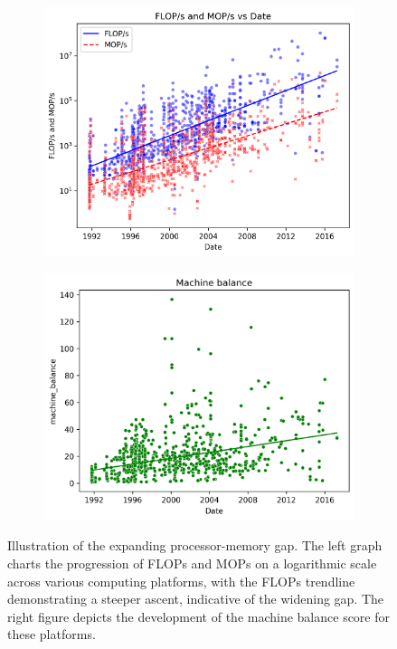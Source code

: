 \begin{figure}
	\begin{subfigure}{.5\textwidth}
		\centering
		\includegraphics[width=\linewidth]{pictures/FLOPs_MOPs_vs_Date.png}
	\end{subfigure}
	\begin{subfigure}{.5\textwidth}
		\centering
		\includegraphics[width=\linewidth]{pictures/machine_balance.png}
	\end{subfigure}
	\caption{Illustration of the expanding processor-memory gap. The left graph charts the progression of FLOPs and MOPs on a logarithmic scale across various computing platforms, with the FLOPs trendline demonstrating a steeper ascent, indicative of the widening gap. The right figure depicts the development of the machine balance score for these platforms.\protect\footnotemark{}}
	\label{fig:pmgap}
\end{figure}

